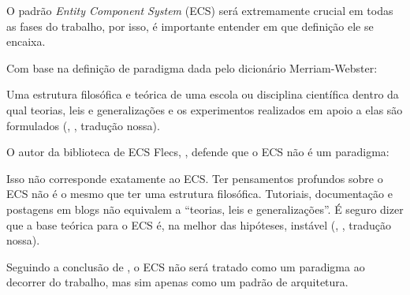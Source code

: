 O padrão \textit{Entity Component System} (ECS) será extremamente crucial em todas as fases do trabalho, por isso, é importante entender em que definição ele se encaixa.

Com base na definição de paradigma dada pelo dicionário Merriam-Webster:

\begin{citacao}
	Uma estrutura filosófica e teórica de uma escola ou disciplina científica dentro da qual teorias, leis e generalizações e os experimentos realizados em apoio a elas são formulados (\citeauthor{merriamwebster}, \citeyear{merriamwebster}, tradução nossa).
\end{citacao}

O autor da biblioteca de ECS Flecs, , defende que o ECS não é um paradigma:

\begin{citacao}
	Isso não corresponde exatamente ao ECS. Ter pensamentos profundos sobre o ECS não é o mesmo que ter uma estrutura filosófica. Tutoriais, documentação e postagens em blogs não equivalem a “teorias, leis e generalizações”. É seguro dizer que a base teórica para o ECS é, na melhor das hipóteses, instável (\citeauthor{ecsparadigm}, \citeyear{ecsparadigm}, tradução nossa).
\end{citacao}

Seguindo a conclusão de , o ECS não será tratado como um paradigma ao decorrer do trabalho, mas sim apenas como um padrão de arquitetura.
